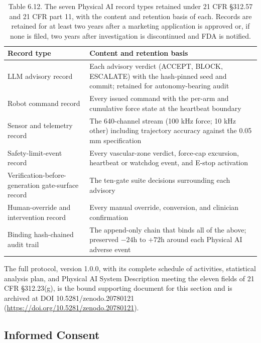 \begin{table}[t]
\caption{Table 6.12. The seven Physical AI record types retained under 21 CFR
\S 312.57 and 21 CFR part 11, with the content and retention basis of each. Records
are retained for at least two years after a marketing application is approved or, if
none is filed, two years after investigation is discontinued and FDA is
notified.}
\label{tab:sec06-records}
\centering
\begin{tabularx}{\textwidth}{L{4.4cm} Y}
\toprule
\textbf{Record type} & \textbf{Content and retention basis} \\
\midrule
LLM advisory record & Each advisory verdict (ACCEPT, BLOCK, ESCALATE) with the hash-pinned seed and commit; retained for autonomy-bearing audit \\
Robot command record & Every issued command with the per-arm and cumulative force state at the heartbeat boundary \\
Sensor and telemetry record & The 640-channel stream (100 kHz force; 10 kHz other) including trajectory accuracy against the 0.05 mm specification \\
Safety-limit-event record & Every vascular-zone verdict, force-cap excursion, heartbeat or watchdog event, and E-stop activation \\
Verification-before-generation gate-surface record & The ten-gate suite decisions surrounding each advisory \\
Human-override and intervention record & Every manual override, conversion, and clinician confirmation \\
Binding hash-chained audit trail & The append-only chain that binds all of the above; preserved $-24$h to $+72$h around each Physical AI adverse event \\
\bottomrule
\end{tabularx}
\end{table}

The full protocol, version 1.0.0, with its complete schedule of activities,
statistical analysis plan, and Physical AI System Description meeting the eleven
fields of 21 CFR \S 312.23(g), is the bound supporting document for this section and
is archived at DOI 10.5281/zenodo.20780121
(\href{https://doi.org/10.5281/zenodo.20780121}{https://doi.org/10.5281/zenodo.20780121}).

\subsection{Informed Consent}

